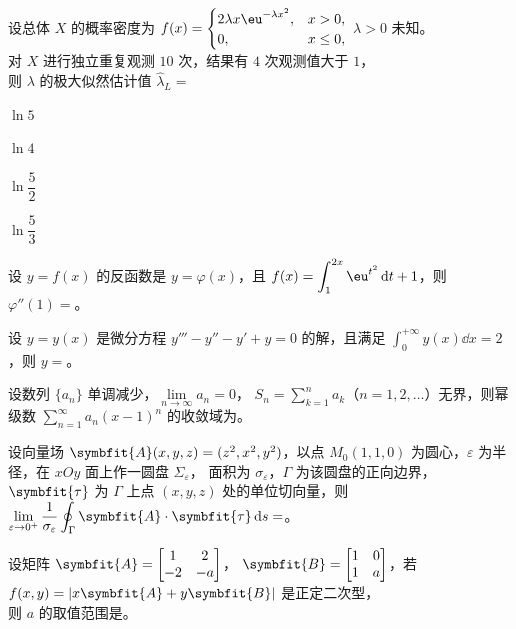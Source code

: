 \begin{question}[index=10]
设总体 $X$ 的概率密度为 $f(x)=\begin{cases}
2\lambda x\eu^{-\lambda x^2}, & x>0,\\
0, & x\le 0,
\end{cases}$ $\lambda>0$ 未知。\\
对 $X$ 进行独立重复观测 $10$ 次，结果有 $4$ 次观测值大于 $1$，\\
则 $\lambda$ 的极大似然估计值 $\hat{\lambda}_L=$\paren
\begin{choices}[columns=4]
\item $\ln 5$
\item $\ln 4$
\item $\ln\dfrac{5}{2}$
\item $\ln\dfrac{5}{3}$
\end{choices}
\end{question}

\fillheading

\begin{question}[index=11]
设 $y=f(x)$ 的反函数是 $y=\varphi(x)$，且
$f(x)=\displaystyle\int_1^{2x}\eu^{t^2}\dd t+1$，则 $\varphi''(1)=$\fillin。
\end{question}

\begin{question}[index=12]
设 $y=y(x)$ 是微分方程 $y'''-y''-y'+y=0$ 的解，且满足
$\displaystyle\int_0^{+\infty}y(x)\dd x=2$，则 $y=$\fillin。
\end{question}

\begin{question}[index=13]
设数列 $\{a_n\}$ 单调减少，$\lim\limits_{n\to\infty}a_n=0$，
$S_n=\displaystyle\sum_{k=1}^n a_k$（$n=1,2,\ldots$）无界，则幂级数
$\displaystyle\sum_{n=1}^{\infty}a_n(x-1)^n$ 的收敛域为\fillin。
\end{question}

\begin{question}[index=14]
设向量场 $\symbfit{A}(x,y,z)=(z^2,x^2,y^2)$，以点 $M_0(1,1,0)$ 为圆心，$\varepsilon$ 为半径，在 $xOy$ 面上作一圆盘 $\Sigma_\varepsilon$，
面积为 $\sigma_\varepsilon$，$\Gamma$ 为该圆盘的正向边界，$\symbfit{\tau}$ 为 $\Gamma$ 上点 $(x,y,z)$ 处的单位切向量，则
$\displaystyle\lim_{\varepsilon\to0^+}\frac{1}{\sigma_\varepsilon}\oint_\Gamma\symbfit{A}\cdot\symbfit{\tau}\dd s=$\fillin。
\end{question}

\begin{question}[index=15]
设矩阵 $\symbfit{A}=\begin{bmatrix}1&2\\-2&-a\end{bmatrix}$，
$\symbfit{B}=\begin{bmatrix}1&0\\1&a\end{bmatrix}$，若
$f(x,y)=|x\symbfit{A}+y\symbfit{B}|$ 是正定二次型，\\
则 $a$ 的取值范围是\fillin。
\end{question}

